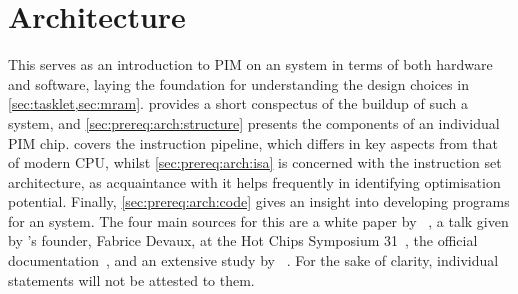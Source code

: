 \section{Architecture}
\label{sec:prereq:arch}

This  serves as an introduction to \ac{PIM} on an \upmem{} system in terms of both hardware and software, laying the foundation for understanding the design choices in \cref{sec:tasklet,sec:mram}.
 provides a short conspectus of the buildup of such a system, and \cref{sec:prereq:arch:structure} presents the components of an individual \ac{PIM} chip.
 covers the instruction pipeline, which differs in key aspects from that of modern \ac{CPU}, whilst \cref{sec:prereq:arch:isa} is concerned with the instruction set architecture, as acquaintance with it helps frequently in identifying optimisation potential.
Finally, \cref{sec:prereq:arch:code} gives an insight into developing programs for an \upmem{} system.
The four main sources for this  are a white paper by \upmem{}~\cite{upmem2021WhitePaper}, a talk given by \upmem{}'s founder, Fabrice Devaux, at the Hot Chips Symposium 31~\cite{upmem2019HotChips}, the official documentation~\cite{upmemSDK}, and an extensive study by \citeauthor{mutlu2022Benchmarking}~\cite{mutlu2022Benchmarking}.
For the sake of clarity, individual statements will not be attested to them.










